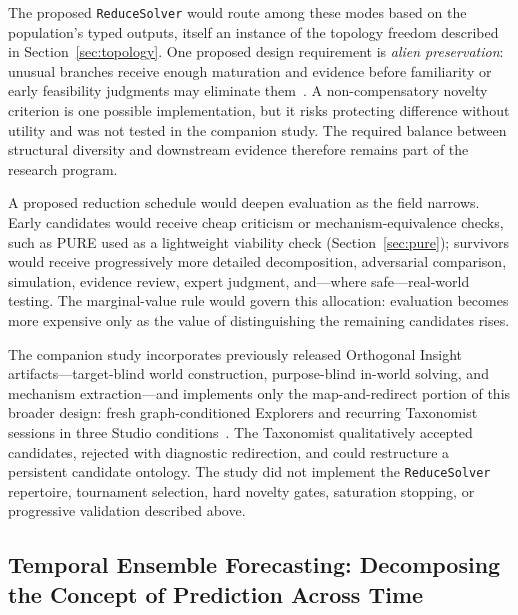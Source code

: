 \documentclass[11pt]{article}
\let\oldtexttt\texttt
\renewcommand{\texttt}[1]{\oldtexttt{\small #1}}
\begin{document}
The proposed \texttt{ReduceSolver} would route among these modes based on the population's typed outputs, itself an instance of the topology freedom described in Section~\ref{sec:topology}. One proposed design requirement is \emph{alien preservation}: unusual branches receive enough maturation and evidence before familiarity or early feasibility judgments may eliminate them~\cite{westerberg2026ontology}. A non-compensatory novelty criterion is one possible implementation, but it risks protecting difference without utility and was not tested in the companion study. The required balance between structural diversity and downstream evidence therefore remains part of the research program.

A proposed reduction schedule would deepen evaluation as the field narrows. Early candidates would receive cheap criticism or mechanism-equivalence checks, such as PURE used as a lightweight viability check (Section~\ref{sec:pure}); survivors would receive progressively more detailed decomposition, adversarial comparison, simulation, evidence review, expert judgment, and---where safe---real-world testing. The marginal-value rule would govern this allocation: evaluation becomes more expensive only as the value of distinguishing the remaining candidates rises.

The companion study incorporates previously released Orthogonal Insight artifacts---target-blind world construction, purpose-blind in-world solving, and mechanism extraction---and implements only the map-and-redirect portion of this broader design: fresh graph-conditioned Explorers and recurring Taxonomist sessions in three Studio conditions~\cite{westerberg2025strangeworlds,westerberg2026ontology}. The Taxonomist qualitatively accepted candidates, rejected with diagnostic redirection, and could restructure a persistent candidate ontology. The study did not implement the \texttt{ReduceSolver} repertoire, tournament selection, hard novelty gates, saturation stopping, or progressive validation described above.

\subsection{Temporal Ensemble Forecasting: Decomposing the Concept of Prediction Across Time}
\label{sec:thl}
\end{document}
